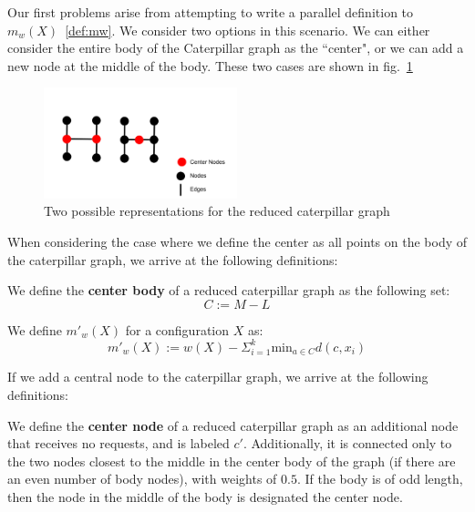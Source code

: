 Our first problems arise from attempting to write a parallel definition to $m_w(X)$~\ref{def:mw}. We consider two options in this scenario. We can either consider the entire body of the Caterpillar graph as the ``center", or we can add a new node at the middle of the body. These two cases are shown in fig.~\ref{fig:smallcat}

\begin{figure}[H]
    \centering
    \includegraphics[width=0.5\textwidth]{images/center.png}
    \caption{Two possible representations for the reduced caterpillar graph}
    \label{fig:smallcat}
\end{figure}

When considering the case where we define the center as all points on the body of the caterpillar graph, we arrive at the following definitions:

\begin{definition}
     We define the \textbf{center body} of a reduced caterpillar graph as the following set:
        \begin{equation*}
            C := M - L
        \end{equation*}
\end{definition}

\begin{definition}
    We define $m'_w(X)$ for a configuration $X$ as:
    \begin{equation*}
        m'_w(X) := w(X) - \Sigma_{i=1} ^ k \mathrm{min}_{a \in C} d(c, x_i)
    \end{equation*}
\end{definition}

If we add a central node to the caterpillar graph, we arrive at the following definitions:

\begin{definition}
    We define the \textbf{center node} of a reduced caterpillar graph as an additional node that receives no requests, and is labeled $c'$. Additionally, it is connected only to the two nodes closest to the middle in the center body of the graph (if there are an even number of body nodes), with weights of $0.5$. If the body is of odd length, then the node in the middle of the body is designated the center node.
\end{definition}

